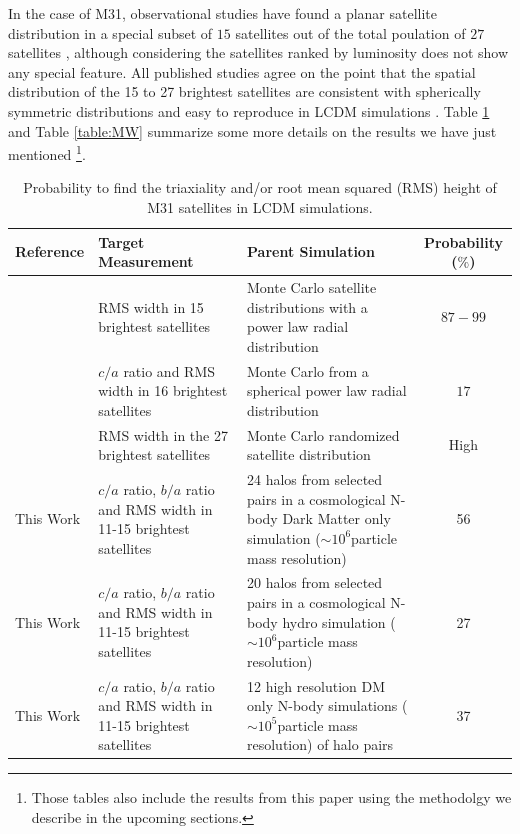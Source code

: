 \documentclass[a4paper,fleqn,usenatbib]{mnras}
\newcommand{\Msun}{{\ifmmode{{\rm{M_{\odot}}}}\else{${\rm{M_{\odot}}}$}\fi}}
\begin{document}
In the case of M31, observational studies have found a planar satellite
distribution in a special subset of $15$ satellites out of the 
total poulation of $27$ satellites \citep{2013ApJ...766..120C,
2013Natur.493...62I}, although considering the satellites ranked by
luminosity does not show any special feature.
All published studies agree on the point that the spatial distribution of
the 15 to 27 brightest satellites are consistent with spherically
symmetric distributions and easy to reproduce in LCDM simulations
\citep{2006AJ....131.1405K,2007MNRAS.374.1125M, 2013ApJ...766..120C}.
Table \ref{table:M31} and Table \ref{table:MW} summarize some more
details on the results we have just mentioned \footnote{
Those tables also include the results from this paper using the
methodolgy we describe in the upcoming sections.}.


\begin{table}
\centering
\begin{tabular}{|p{4.0cm}|p{4.5cm}| p{5.5cm}| c|}\hline
Reference & Target Measurement & Parent Simulation & Probability ($\%$)\\\hline
\text{\cite{2006AJ....131.1405K}} & RMS width in 15 brightest
satellites & Monte Carlo satellite distributions with a power law
radial distribution & $87-99$\\
\text{\cite{2007MNRAS.374.1125M}} & $c/a$ ratio and RMS width in 16 brightest satellites & Monte Carlo from a spherical power law radial
distribution & $17$\\
\text{\cite{2013ApJ...766..120C}}& RMS width in the 27 brightest
satellites & Monte Carlo randomized satellite distribution & High\\
This Work & $c/a$ ratio, $b/a$ ratio and RMS width in 11-15 brightest
satellites & 24 halos from selected pairs in a cosmological N-body Dark Matter only simulation ($\sim
10^{6}$\Msun particle mass resolution)& 56 \\
This Work & $c/a$ ratio, $b/a$ ratio and RMS width in 11-15 brightest
satellites & 20 halos from selected pairs in a cosmological N-body hydro simulation ($\sim
10^{6}$\Msun particle mass resolution)& 27 \\
This Work & $c/a$ ratio, $b/a$ ratio and RMS width in 11-15 brightest
satellites & 12 high resolution DM only N-body simulations ($\sim
10^{5}$\Msun particle mass resolution) of halo pairs & 37 \\
\hline
\end{tabular}
\caption{Probability to find  the triaxiality and/or root mean squared
  (RMS) height of M31 satellites in LCDM simulations. 
\label{table:M31}}
\end{table}
\end{document}
